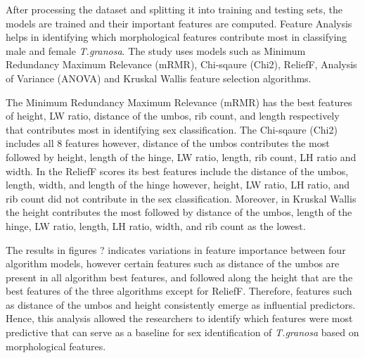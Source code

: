 After processing the dataset and splitting it into training and testing sets, the models are trained and their important features are computed. Feature Analysis helps in identifying which morphological features contribute most in classifying male and female \textit{T.granosa}. The study uses models such as Minimum Redundancy Maximum Relevance (mRMR), Chi-sqaure (Chi2), ReliefF, Analysis of Variance (ANOVA) and Kruskal Wallis feature selection algorithms. 

The Minimum Redundancy Maximum Relevance (mRMR) has the best features of height, LW ratio, distance of the umbos, rib count, and length respectively that contributes most in identifying sex classification. The Chi-sqaure (Chi2) includes all 8 features however, distance of the umbos contributes the most followed by height, length of the hinge, LW ratio, length, rib count, LH ratio and width. In the ReliefF scores its best features include the distance of the umbos, length, width, and length of the hinge however, height, LW ratio, LH ratio, and rib count did not contribute in the sex classification. Moreover, in Kruskal Wallis the height contributes the most followed by distance of the umbos, length of the hinge, LW ratio, length, LH ratio, width, and rib count as the lowest. 

The results in figures ?  indicates variations in feature importance between four algorithm models, however certain features such as distance of the umbos are present in all algorithm best features, and followed along the height that are the best features of the three algorithms except for ReliefF. Therefore, features such as distance of the umbos and height consistently emerge as influential predictors. Hence, this analysis allowed the researchers to identify which features were most predictive that can serve as a baseline for sex identification of \textit{T.granosa} based on morphological features. 




